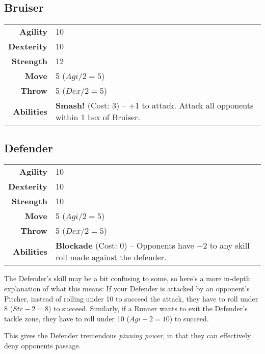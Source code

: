 \subsection{Bruiser}
\begin{center}
\begin{tabular}{r|p{5cm}}
    \textbf{Agility} & 10 \\
    \textbf{Dexterity} & 10 \\
    \textbf{Strength} & 12 \\ \hline
    \textbf{Move} & 5 ($Agi/2=5$)\\
    \textbf{Throw} & 5 ($Dex/2=5$) \\ \hline
    \textbf{Abilities} & \textbf{Smash!} (Cost: 3) -- +1 to attack. Attack all opponents within 1 hex of Bruiser.
\end{tabular}
\end{center}

\subsection{Defender}
\begin{center}
\begin{tabular}{r|p{5cm}}
    \textbf{Agility} & 10 \\
    \textbf{Dexterity} & 10 \\
    \textbf{Strength} & 10 \\ \hline
    \textbf{Move} & 5 ($Agi/2=5$)\\
    \textbf{Throw} & 5 ($Dex/2=5$) \\ \hline
    \textbf{Abilities} & \textbf{Blockade} (Cost: 0) -- Opponents have $-2$ to any skill roll made against the defender.
\end{tabular}
\end{center}

The Defender's skill may be a bit confusing to some, so here's a more in-depth explanation of what this means: If your Defender is attacked by an opponent's Pitcher, instead of rolling under 10 to succeed the attack, they have to roll under 8 ($Str-2=8$) to succeed. Similarly, if a Runner wants to exit the Defender's tackle zone, they have to roll under 10 ($Agi-2=10$) to succeed.

This gives the Defender tremendous \textit{pinning power}, in that they can effectively deny opponents passage.
